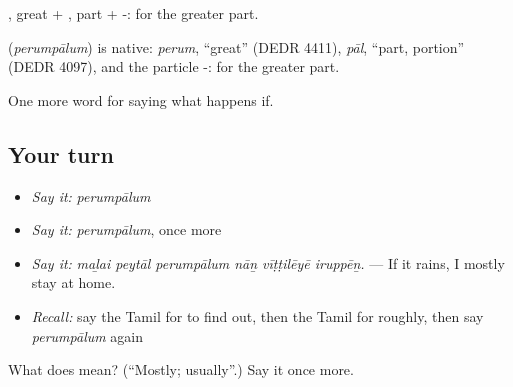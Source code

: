 , great + , part + -: for the greater part.

\begin{cousinweb}
\textbf{} (\emph{perumpālum}) is native: \emph{perum}, \textquotedblleft{}great\textquotedblright{} (DEDR 4411), \emph{pāl}, \textquotedblleft{}part, portion\textquotedblright{} (DEDR 4097), and the particle -: for the greater part.
\end{cousinweb}

\begin{grammarlens}[title={What you've built}]
One more word for saying what happens if.
\end{grammarlens}

\subsection*{Your turn}
\begin{itemize}
\raggedright
  \item \emph{Say it:} \emph{perumpālum}
  \item \emph{Say it:} \emph{perumpālum}, once more
  \item \emph{Say it:} \emph{maḻai peytāl perumpālum nāṉ vīṭṭilēyē iruppēṉ.} — If it rains, I mostly stay at home.
  \item \emph{Recall:} say the Tamil for to find out, then the Tamil for roughly, then say \emph{perumpālum} again
\end{itemize}

\begin{tcolorbox}[breakable,colback=teal!4,colframe=teal!35!black,title={Before you move on}]
What does  mean? (\textquotedblleft{}Mostly; usually\textquotedblright{}.) Say it once more.
\end{tcolorbox}
